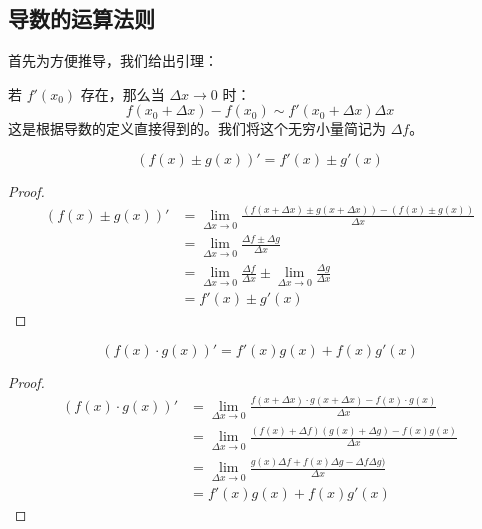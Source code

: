 \subsection{导数的运算法则}

首先为方便推导，我们给出引理：

\begin{lemma}
	若 $f'(x_0)$ 存在，那么当 $\Delta x \to 0$ 时：
	$$
	f(x_0 + \Delta x) - f(x_0) \sim f'(x_0 + \Delta x) \Delta x
	$$
	这是根据导数的定义直接得到的。我们将这个无穷小量简记为 $\Delta f$。
\end{lemma}

\begin{theorem}[导数的加减法则]
	$$
	(f(x) \pm g(x))' = f'(x) \pm g'(x)
	$$
	\begin{proof}
		$$
		\begin{aligned}
			(f(x) \pm g(x))' & = \lim_{\Delta x \to 0} \frac{(f(x + \Delta x) \pm g(x + \Delta x)) - (f(x) \pm g(x))}{\Delta x} \\
			& = \lim_{\Delta x \to 0} \frac{\Delta f \pm \Delta g}{\Delta x} \\
			& = \lim_{\Delta x \to 0} \frac{\Delta f}{\Delta x} \pm \lim_{\Delta x \to 0} \frac{\Delta g}{\Delta x} \\
			& = f'(x) \pm g'(x)
		\end{aligned}
		$$
	\end{proof}
\end{theorem}

\begin{theorem}[导数的乘法法则]
	$$
	(f(x) \cdot g(x))' = f'(x) g(x) + f(x) g'(x)
	$$
	\begin{proof}
		$$
		\begin{aligned}
			(f(x) \cdot g(x))' & = \lim_{\Delta x \to 0} \frac{f(x + \Delta x) \cdot g(x + \Delta x) - f(x) \cdot g(x)}{\Delta x} \\
			& = \lim_{\Delta x \to 0} \frac{(f(x) + \Delta f)(g(x) + \Delta g) - f(x) g(x)}{\Delta x} \\
			& = \lim_{\Delta x \to 0} \frac{g(x) \Delta f + f(x) \Delta g - \Delta f \Delta g)}{\Delta x} \\
			& = f'(x) g(x) + f(x) g'(x)
		\end{aligned}
		$$
	\end{proof}
\end{theorem}

